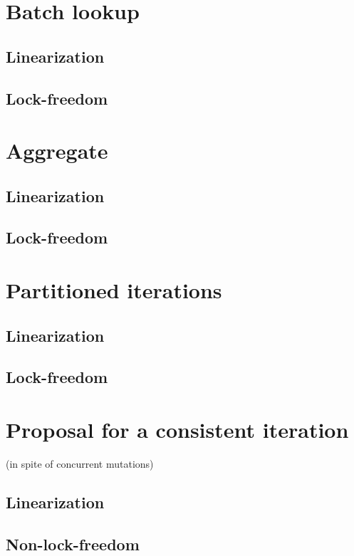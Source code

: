 \section{Batch lookup}
\subsection{Linearization}
\subsection{Lock-freedom}

\section{Aggregate}
\subsection{Linearization}
\subsection{Lock-freedom}

\section{Partitioned iterations}
\subsection{Linearization}
\subsection{Lock-freedom}

\section{Proposal for a consistent iteration}

(in spite of concurrent mutations)

\subsection{Linearization}
\subsection{Non-lock-freedom}
